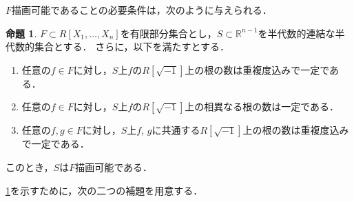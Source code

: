 \documentclass[uplatex, dvipdfmx]{jsarticle}
\newcommand{\R}{\mathbb{R}}
\theoremstyle{definition}
\newtheorem{proposition}{命題}[section]
\begin{document}
$F$描画可能であることの必要条件は，次のように与えられる．

\begin{proposition}\label{proposition:del}
     $F \subset R[X_1, \dots, X_n]$を有限部分集合とし，$S \subset \R^{n-1}$を半代数的連結な半代数的集合とする．
     さらに，以下を満たすとする．
     \begin{enumerate}
          \item 任意の$f \in F$に対し，$S$上$f$の$R[\sqrt{-1}]$上の根の数は重複度込みで一定である．
          \item 任意の$f \in F$に対し，$S$上$f$の$R[\sqrt{-1}]$上の相異なる根の数は一定である．
          \item 任意の$f, g \in F$に対し，$S$上$f$, $g$に共通する$R[\sqrt{-1}]$上の根の数は重複度込みで一定である．
     \end{enumerate}
     このとき，$S$は$F$描画可能である．
\end{proposition}

\cref{proposition:del}を示すために，次の二つの補題を用意する．
\end{document}
